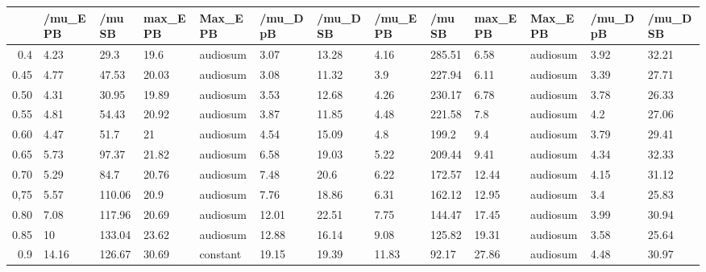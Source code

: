 \begin{table}[ht]
\centering
\begin{tabular}{rllllllllllll}
  \hline
 & /mu\_E PB & /mu SB & max\_E PB & Max\_E PB & /mu\_D pB & /mu\_D SB & /mu\_E PB & /mu SB & max\_E PB & Max\_E PB & /mu\_D pB & /mu\_D SB \\ 
  \hline
0.4 & 4.23 & 29.3 & 19.6 & audiosum & 3.07 & 13.28 & 4.16 & 285.51 & 6.58 & audiosum & 3.92 & 32.21 \\ 
  0.45 & 4.77 & 47.53 & 20.03 & audiosum & 3.08 & 11.32 & 3.9 & 227.94 & 6.11 & audiosum & 3.39 & 27.71 \\ 
  0.50 & 4.31 & 30.95 & 19.89 & audiosum & 3.53 & 12.68 & 4.26 & 230.17 & 6.78 & audiosum & 3.78 & 26.33 \\ 
  0.55 & 4.81 & 54.43 & 20.92 & audiosum & 3.87 & 11.85 & 4.48 & 221.58 & 7.8 & audiosum & 4.2 & 27.06 \\ 
  0.60 & 4.47 & 51.7 & 21 & audiosum & 4.54 & 15.09 & 4.8 & 199.2 & 9.4 & audiosum & 3.79 & 29.41 \\ 
  0.65 & 5.73 & 97.37 & 21.82 & audiosum & 6.58 & 19.03 & 5.22 & 209.44 & 9.41 & audiosum & 4.34 & 32.33 \\ 
  0.70 & 5.29 & 84.7 & 20.76 & audiosum & 7.48 & 20.6 & 6.22 & 172.57 & 12.44 & audiosum & 4.15 & 31.12 \\ 
  0,75 & 5.57 & 110.06 & 20.9 & audiosum & 7.76 & 18.86 & 6.31 & 162.12 & 12.95 & audiosum & 3.4 & 25.83 \\ 
  0.80 & 7.08 & 117.96 & 20.69 & audiosum & 12.01 & 22.51 & 7.75 & 144.47 & 17.45 & audiosum & 3.99 & 30.94 \\ 
  0.85 & 10 & 133.04 & 23.62 & audiosum & 12.88 & 16.14 & 9.08 & 125.82 & 19.31 & audiosum & 3.58 & 25.64 \\ 
  0.9 & 14.16 & 126.67 & 30.69 & constant & 19.15 & 19.39 & 11.83 & 92.17 & 27.86 & audiosum & 4.48 & 30.97 \\ 
   \hline
\end{tabular}
\end{table}
